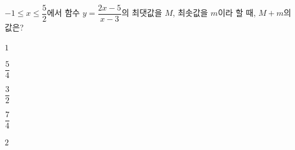 $-1\le x\le\dfrac{5}{2}$에서 함수 $y=\dfrac{2x-5}{x-3}$의 최댓값을 $M$, 최솟값을 $m$이라 할 때, $M+m$의 값은?
\begin{choices32}{\rule[-3ex]{0pt}{8ex}$1$}{\rule[-3ex]{0pt}{8ex}$\dfrac{5}{4}$}{\rule[-3ex]{0pt}{8ex}$\dfrac{3}{2}$}{\rule[-3ex]{0pt}{8ex}$\dfrac{7}{4}$}{\rule[-3ex]{0pt}{8ex}$2$}\end{choices32}
